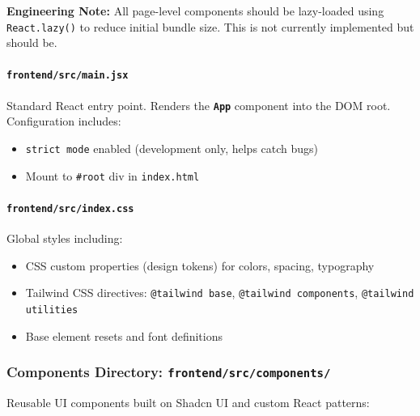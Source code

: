 \documentclass[12pt,a4paper,oneside]{article}
\newcommand{\fileref}[1]{\texttt{#1}}
\newcommand{\classname}[1]{\texttt{\textbf{#1}}}
\begin{document}
\textbf{Engineering Note:} All page-level components should be lazy-loaded using \texttt{React.lazy()} to reduce initial bundle size. This is not currently implemented but should be.

\paragraph{\fileref{frontend/src/main.jsx}}

Standard React entry point. Renders the \classname{App} component into the DOM root. Configuration includes:
\begin{itemize}
    \item \texttt{strict mode} enabled (development only, helps catch bugs)
    \item Mount to \texttt{\#root} div in \fileref{index.html}
\end{itemize}

\paragraph{\fileref{frontend/src/index.css}}

Global styles including:
\begin{itemize}
    \item CSS custom properties (design tokens) for colors, spacing, typography
    \item Tailwind CSS directives: \texttt{@tailwind base}, \texttt{@tailwind components}, \texttt{@tailwind utilities}
    \item Base element resets and font definitions
\end{itemize}

\subsubsection{Components Directory: \fileref{frontend/src/components/}}

Reusable UI components built on Shadcn UI and custom React patterns:
\end{document}

